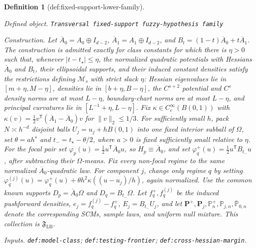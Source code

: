 \documentclass{article}
\newtheorem{definition}{Definition}
\begin{document}
\begin{definition}[def:fixed-support-lower-family]\label{def:fixed-support-lower-family}
\par\smallskip\noindent\emph{Defined object.} \texttt{Transversal fixed-\allowbreak{}support fuzzy-\allowbreak{}hypothesis family}
\par\smallskip\noindent\emph{Construction.} Let \(\overline A_0=A_0\oplus I_{d-2}\), \(\overline A_1=A_1\oplus I_{d-2}\), and \(B_t=(1-t)\overline A_0+t\overline A_1\). The construction is admitted exactly for class constants for which there is \(\eta>0\) such that, whenever \(\lvert t-t_\star\rvert\le\eta\), the normalized quadratic potentials with Hessians \(\overline A_0\) and \(B_t\), their ellipsoidal supports, and their induced constant densities satisfy the restrictions defining \(\mathcal M_s\) with strict slack \(\eta\): Hessian eigenvalues lie in \([m+\eta,M-\eta]\), densities lie in \([b+\eta,B-\eta]\), the \(C^{s+2}\) potential and \(C^s\) density norms are at most \(L-\eta\), boundary-chart norms are at most \(L-\eta\), and principal curvatures lie in \([L^{-1}+\eta,L-\eta]\). Fix \(\kappa\in C_c^\infty(B(0,1))\) with \(\kappa(v)=\tfrac12v^{\mathsf T}(\overline A_1-\overline A_0)v\) for \(\lVert v\rVert_2\le1/3\). For sufficiently small \(h\), pack \(N\asymp h^{-d}\) disjoint balls \(U_j=u_j+hB(0,1)\) into one fixed interior subball of \(\Omega\), set \(\theta=ah^s\) and \(t_{-}=t_\star-\theta/2\), where \(a>0\) is fixed sufficiently small relative to \(\eta\). For the focal pair set \(\varphi_p(u)=\tfrac12u^{\mathsf T}\overline A_0u\), so \(H_p\equiv\overline A_0\), and set \(\varphi_q^+(u)=\tfrac12u^{\mathsf T}B_{t_{-}}u\), after subtracting their \(\Omega\)-means. Fix every non-focal regime to the same normalized \(\overline A_0\)-quadratic law. For component \(j\), change only regime \(q\) by setting \(\varphi_q^{(j)}(u)=\varphi_q^+(u)+\theta h^2\kappa((u-u_j)/h)\), again normalized. Use the common known supports \(D_p=\overline A_0\Omega\) and \(D_q=B_{t_{-}}\Omega\). Let \(f_q^+,f_q^{(j)}\) be the induced pushforward densities, \(e_j=f_q^{(j)}-f_q^+\), \(E_j=B_{t_{-}}U_j\), and let \(\mathbf P^+,\mathbf P_j,\mathbb P_n^+,\mathbb P_{j,n},\overline{\mathbb P}_{0,n}\) denote the corresponding SCMs, sample laws, and uniform null mixture. This collection is \(\mathfrak F_{\mathrm{LB}}\).
\par\smallskip\noindent\emph{Inputs.} \texttt{def:\allowbreak{}model-\allowbreak{}class}; \texttt{def:\allowbreak{}testing-\allowbreak{}frontier}; \texttt{def:\allowbreak{}cross-\allowbreak{}hessian-\allowbreak{}margin}.
\end{definition}
\end{document}
